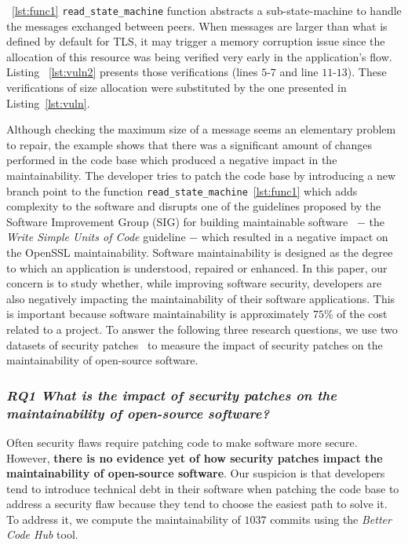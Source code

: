 \documentclass[10pt,conference]{IEEEtran}
\begin{document}

~\ref{lst:func1} \texttt{read\_state\_machine} function abstracts a sub-state-machine
to handle the messages exchanged between peers. When messages are larger than
what is defined by default for TLS, it may trigger a memory corruption issue since the allocation
of this resource was being verified very early in the application's flow.  Listing ~\ref{lst:vuln2} presents those verifications (lines $5$-$7$ and line $11$-$13$).
These verifications of size allocation were substituted by the one presented in Listing~\ref{lst:vuln}.

%
Although checking the maximum size of a message seems an elementary
problem to repair, the example shows that there was a significant amount of
changes performed in the code base which produced a negative impact in the
maintainability. The developer tries to patch the
code base by introducing a new branch point to the function \texttt{read\_state\_machine}~\ref{lst:func1} which adds complexity to the software
and disrupts
one of the guidelines proposed by the Software Improvement Group (SIG) for
building maintainable software~\cite{Visser:2016:OREILLY} $-$
the \emph{Write Simple Units of Code} guideline $-$ which resulted in a negative impact on the
OpenSSL maintainability.
Software maintainability is designed as the degree to which an application is understood, repaired or enhanced. In this paper, our concern is to study whether, while improving software
security, developers are also negatively impacting the maintainability of their
software applications. This is important because software maintainability is approximately $75\%$ of the cost related to a project. To answer the following three research questions, we use two datasets
of security patches~\cite{Reis:2017:IJSSE, 10.1109/MSR.2019.00064} to measure the impact of
security patches on the maintainability of open-source software. 
%

\subsubsection*{\textit{\textbf{RQ1} \textbf{What is the impact of security patches on the
maintainability of open-source software?}}}

Often security flaws require patching code to make software more secure.
However, \textbf{there is no evidence yet of how security patches impact the
maintainability of open-source software}. Our suspicion is that developers tend
to introduce technical debt in their software when patching the code base to
address a security flaw because they tend to choose the easiest path to solve
it. To address it, we compute the maintainability of $1037$ commits using the
\emph{Better Code Hub} tool. 
%
\end{document}
